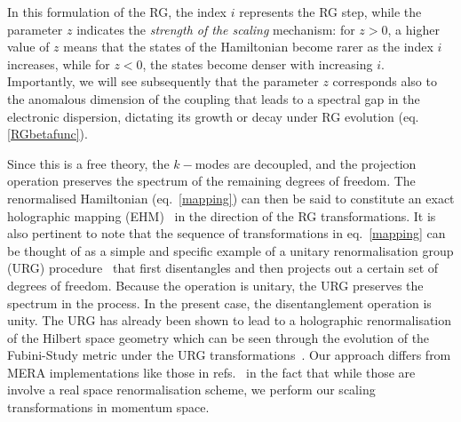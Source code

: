 In this formulation of the RG, the index \(i\) represents the RG step, while the parameter \(z\) indicates the {\it strength of the scaling} mechanism: for \(z>0 \), a higher value of \(z\) means that the states of the Hamiltonian become rarer as the index \(i\) increases, while for \(z<0\), the states become denser with increasing \(i\). Importantly, we will see subsequently that the parameter $z$ corresponds also to the anomalous dimension of the coupling that leads to a spectral gap in the electronic dispersion, dictating its growth or decay under RG evolution (eq.\eqref{RGbetafunc}).

Since this is a free theory, the \(k-\)modes are decoupled, and the projection operation preserves the spectrum of the remaining degrees of freedom. The renormalised Hamiltonian (eq.~\eqref{mapping}) can then be said to constitute an exact holographic mapping (EHM)~\cite{qi2013,lee2016} in the direction of the RG transformations. It is also pertinent to note that the sequence of transformations in eq.~\eqref{mapping} can be thought of as a simple and specific example of a unitary renormalisation group (URG) procedure~\cite{anirbanurg1,anirbanurg2} that first disentangles and then projects out a certain set of degrees of freedom. Because the operation is unitary, the URG preserves the spectrum in the process.
In the present case, the disentanglement operation is unity. The URG has already been shown to lead to a holographic renormalisation of the Hilbert space geometry which can be seen through the evolution of the Fubini-Study metric under the URG transformations~\cite{anirbanurg1}. Our approach differs from MERA implementations like those in refs.~\cite{evenbly2009,evenbly_2016} in the fact that while those are involve a real space renormalisation scheme, we perform our scaling transformations in momentum space.

